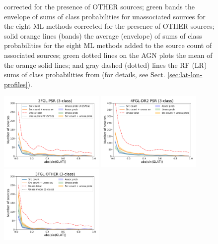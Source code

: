 \documentclass[referee]{aa} %
\begin{document}
\begin{figure}[h]
{corrected for the presence of OTHER sources; green bands the envelope of sums of class probabilities for unassociated sources for the eight ML methods corrected for the presence of OTHER sources; solid orange lines (bands) the average (envelope) of sums of class probabilities for the eight ML methods added to the source count of associated sources; green dotted lines on the AGN plots the mean of the orange solid lines; and gray dashed (dotted) lines the RF (LR) sums of class probabilities from \cite{2016ApJ...820....8S} (for details, see Sect. \ref{sec:lat-lon-profiles}). }  
\label{fig:lat_profile}
\end{figure}

\begin{figure}[h]
\centering
\includegraphics[width=0.45\textwidth]{plots/lat_profile_PSR_3FGL_3classes.pdf}
\includegraphics[width=0.45\textwidth]{plots/lat_profile_PSR_4FGL-DR2_3classes.pdf} \\
\includegraphics[width=0.45\textwidth]{plots/lat_profile_OTHER_3FGL_3classes.pdf}

\end{figure}
\end{document}
